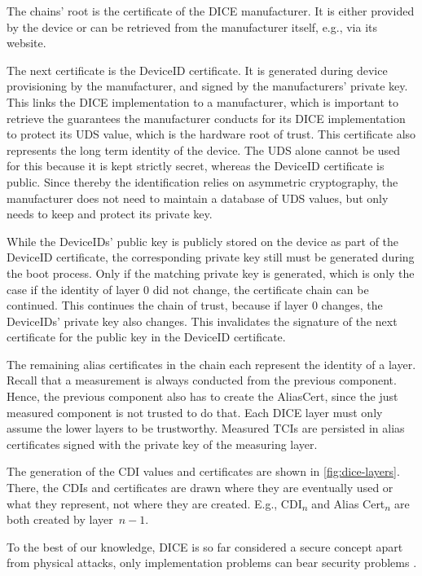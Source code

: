 The chains' root is the certificate of the DICE manufacturer. It is either provided by the device or can be retrieved from the manufacturer itself, e.g., via its website.


The next certificate is the DeviceID certificate.
It is generated during device provisioning by the manufacturer, and signed by the manufacturers' private key.
This links the DICE implementation to a manufacturer, which is important to retrieve the guarantees the manufacturer conducts for its DICE implementation to protect its UDS value, which is the hardware root of trust.
This certificate also represents the long term identity of the device.
The UDS alone cannot be used for this because it is kept strictly secret, whereas the DeviceID certificate is public.
Since thereby the identification relies on asymmetric cryptography, the manufacturer does not need to maintain a database of UDS values, but only needs to keep and protect its private key.


While the DeviceIDs' public key is publicly stored on the device as part of the DeviceID certificate, the corresponding private key still must be generated during the boot process.
Only if the matching private key is generated, which is only the case if the identity of layer 0 did not change, the certificate chain can be continued.
This continues the chain of trust, because if layer 0 changes, the DeviceIDs' private key also changes.
This invalidates the signature of the next certificate for the public key in the DeviceID certificate.


The remaining alias certificates in the chain each represent the identity of a layer.
Recall that a measurement is always conducted from the previous component. Hence, the previous component also has to create the AliasCert, since the just measured component is not trusted to do that. Each DICE layer must only assume the lower layers to be trustworthy.
Measured TCIs are persisted in alias certificates signed with the private key of the measuring layer.




The generation of the CDI values and certificates are shown in \autoref{fig:dice-layers}.
There, the CDIs and certificates are drawn where they are eventually used or what they represent, not where they are created.
E.g., CDI\textsubscript{$n$} and Alias Cert\textsubscript{$n$} are both created by layer~$n-1$.


To the best of our knowledge, \ac{DICE} is so far considered a secure concept apart from physical attacks, only implementation problems can bear security problems \cite{Jaeger2020, Hristozov2022}.

